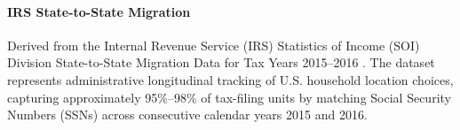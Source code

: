 
\paragraph{IRS State-to-State Migration} Derived from the Internal Revenue Service (IRS) Statistics of Income (SOI) Division State-to-State Migration Data for Tax Years 2015--2016 \citep{irs2016migration}. The dataset represents administrative longitudinal tracking of U.S. household location choices, capturing approximately 95\%--98\% of tax-filing units by matching Social Security Numbers (SSNs) across consecutive calendar years 2015 and 2016.



